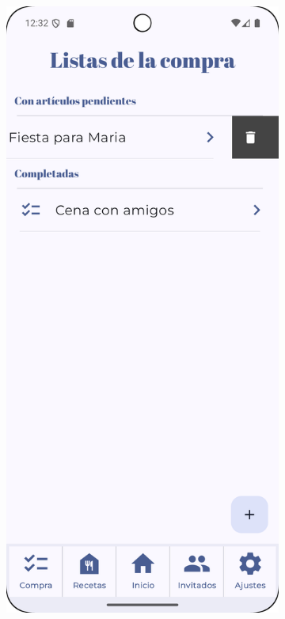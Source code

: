 \begin{figure}[H]
    \begin{subfigure}[b]{0.3\textwidth}
      \includegraphics[width=\textwidth]{./img/manual/delete_shopping.png}

\end{subfigure}
\end{figure}
